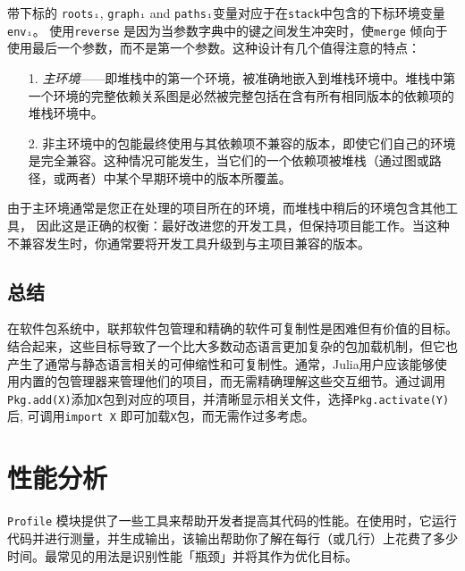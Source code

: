 带下标的 \texttt{rootsᵢ}, \texttt{graphᵢ} and \texttt{pathsᵢ}变量对应于在\texttt{stack}中包含的下标环境变量\texttt{envᵢ}。 使用\texttt{reverse} 是因为当参数字典中的键之间发生冲突时，使\texttt{merge} 倾向于使用最后一个参数，而不是第一个参数。这种设计有几个值得注意的特点：



\begin{itemize}
\item[1. ] \emph{主环境}——即堆栈中的第一个环境，被准确地嵌入到堆栈环境中。堆栈中第一个环境的完整依赖关系图是必然被完整包括在含有所有相同版本的依赖项的堆栈环境中。


\item[2. ] 非主环境中的包能最终使用与其依赖项不兼容的版本，即使它们自己的环境是完全兼容。这种情况可能发生，当它们的一个依赖项被堆栈（通过图或路径，或两者）中某个早期环境中的版本所覆盖。

\end{itemize}


由于主环境通常是您正在处理的项目所在的环境，而堆栈中稍后的环境包含其他工具， 因此这是正确的权衡：最好改进您的开发工具，但保持项目能工作。当这种不兼容发生时，你通常要将开发工具升级到与主项目兼容的版本。



\hypertarget{16711373200664757596}{}


\section{总结}



在软件包系统中，联邦软件包管理和精确的软件可复制性是困难但有价值的目标。结合起来，这些目标导致了一个比大多数动态语言更加复杂的包加载机制，但它也产生了通常与静态语言相关的可伸缩性和可复制性。通常，Julia用户应该能够使用内置的包管理器来管理他们的项目，而无需精确理解这些交互细节。通过调用\texttt{Pkg.add({\textquotedbl}X{\textquotedbl})}添加\texttt{X}包到对应的项目，并清晰显示相关文件，选择\texttt{Pkg.activate({\textquotedbl}Y{\textquotedbl})}后, 可调用\texttt{import X} 即可加载\texttt{X}包，而无需作过多考虑。



\hypertarget{9798162676380759856}{}


\chapter{性能分析}



\texttt{Profile} 模块提供了一些工具来帮助开发者提高其代码的性能。在使用时，它运行代码并进行测量，并生成输出，该输出帮助你了解在每行（或几行）上花费了多少时间。最常见的用法是识别性能「瓶颈」并将其作为优化目标。



